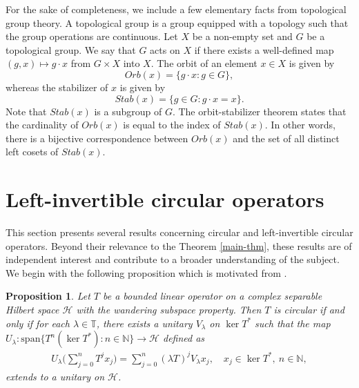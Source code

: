 \documentclass[a4paper,oneside,10pt, reqno]{amsproc}
\newtheorem{proposition}[theorem]{Proposition}%
\theoremstyle{remark}
\theoremstyle{definition}
\newcommand{\beq}{\begin{eqnarray}}
\newcommand{\eeq}{\end{eqnarray}}
\newcommand{\rar}{\rightarrow}
\begin{document}
For the sake of completeness, we include a few elementary facts from topological group theory. A topological group is a group equipped with a topology such that the group operations are continuous. Let $X$ be a non-empty set and $G$ be a topological group. We say that $G$ acts on $X$ if there exists a well-defined map $(g,x) \mapsto g\cdot x$ from $G \times X$ into $X$. The orbit of an element $x \in X$ is given by
\[Orb(x) = \{g\cdot x : g \in G\},\]
whereas the stabilizer of $x$ is given by
\[Stab(x) = \{g \in G : g\cdot x = x\}.\]
Note that $Stab(x)$ is a subgroup of $G$. The orbit-stabilizer theorem states that the cardinality of $Orb(x)$ is equal to the index of $Stab(x)$. In other words, there is a bijective correspondence between $Orb(x)$ and the set of all distinct left cosets of $Stab(x)$. 
 
\section{Left-invertible circular operators}

This section presents several results concerning circular and left-invertible circular operators. Beyond their relevance to the Theorem \ref{main-thm}, these results are of independent interest and contribute to a broader understanding of the subject. We begin with the following proposition which is motivated from \cite[Lemma 2.3]{GKMP}.

\begin{proposition}
Let $T$ be a bounded linear operator on a complex separable Hilbert space $\mathcal H$ with the wandering subspace property. Then $T$ is circular if and only if for each $\lambda \in \mathbb T$, there exists a unitary $V_\lambda$ on $\ker T^*$ such that the map $U_\lambda : \mathrm{span}\{T^n(\ker T^*) : n \in \mathbb N\} \rar \mathcal H$ defined as
\beq\label{U-theta-eq}
U_\lambda \Big(\sum_{j=0}^n T^j x_j \Big) = \sum_{j=0}^n (\lambda T)^j V_\lambda x_j, \quad x_j \in \ker T^*, \ n \in \mathbb N,
\eeq
extends to a unitary on $\mathcal H$.
\end{proposition}
\end{document}
